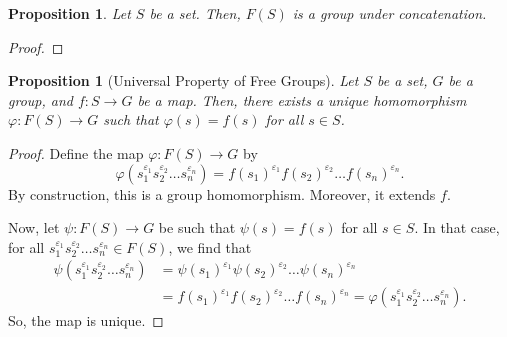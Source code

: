 \documentclass[a4paper, openany]{memoir}
\theoremstyle{definition}
\theoremstyle{plain}
\newtheorem{proposition}[definition]{Proposition}
\begin{document}
    \begin{proposition}
        Let $S$ be a set. Then, $F(S)$ is a group under concatenation.
    \end{proposition}
    \begin{proof}
        
    \end{proof}

    \begin{proposition}[Universal Property of Free Groups]
        Let $S$ be a set, $G$ be a group, and $f: S \to G$ be a map. Then, there exists a unique homomorphism $\varphi: F(S) \to G$ such that $\varphi(s) = f(s)$ for all $s \in S$.
    \end{proposition}
    \begin{proof}
        Define the map $\varphi \colon F(S) \to G$ by 
        \[\varphi(s_1^{\varepsilon_1} s_2^{\varepsilon_2} \dots s_n^{\varepsilon_n}) = f(s_1)^{\varepsilon_1} f(s_2)^{\varepsilon_2} \dots f(s_n)^{\varepsilon_n}.\]
        By construction, this is a group homomorphism. Moreover, it extends $f$.

        Now, let $\psi \colon F(S) \to G$ be such that $\psi(s) = f(s)$ for all $s \in S$. In that case, for all $s_1^{\varepsilon_1} s_2^{\varepsilon_2} \dots s_n^{\varepsilon_n} \in F(S)$, we find that
        \begin{align*}
            \psi(s_1^{\varepsilon_1} s_2^{\varepsilon_2} \dots s_n^{\varepsilon_n}) &= \psi(s_1)^{\varepsilon_1} \psi(s_2)^{\varepsilon_2} \dots \psi(s_n)^{\varepsilon_n} \\
            &= f(s_1)^{\varepsilon_1} f(s_2)^{\varepsilon_2} \dots f(s_n)^{\varepsilon_n} = \varphi(s_1^{\varepsilon_1} s_2^{\varepsilon_2} \dots s_n^{\varepsilon_n}).
        \end{align*}
        So, the map is unique.
    \end{proof}
\end{document}
